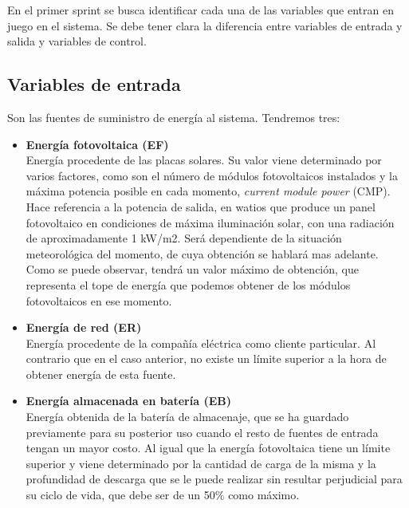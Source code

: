 En el primer sprint se busca identificar cada una de las variables que entran en juego en el sistema. Se debe tener clara la diferencia entre variables de entrada y salida y variables de control. 
\subsection{Variables de entrada} 
Son las fuentes de suministro de energía al sistema. Tendremos tres:
\begin{itemize}
	\item \textbf{Energía fotovoltaica (EF)}\\ Energía procedente de las placas solares. Su valor viene determinado por varios factores, como son el número de módulos fotovoltaicos instalados y la máxima potencia posible en cada momento, \textit{current module power} (CMP). Hace referencia a la potencia de salida, en watios que produce un panel fotovoltaico en condiciones de máxima iluminación solar, con una radiación de aproximadamente 1 kW/m2. Será dependiente de la situación meteorológica del momento, de cuya obtención se hablará mas adelante. Como se puede observar, tendrá un valor máximo de obtención, que representa el tope de energía que podemos obtener de los módulos fotovoltaicos en ese momento.
	\item \textbf{Energía de red (ER)}\\ Energía procedente de la compañía eléctrica como cliente particular. Al contrario que en el caso anterior, no existe un límite superior a la hora de obtener energía de esta fuente.
	\item \textbf{Energía almacenada en batería (EB)}\\ Energía obtenida de la batería de almacenaje, que se ha guardado previamente para su posterior uso cuando el resto de fuentes de entrada tengan un mayor costo. Al igual que la energía fotovoltaica tiene un límite superior y viene determinado por la cantidad de carga de la misma y la profundidad de descarga que se le puede realizar sin resultar perjudicial para su ciclo de vida, que debe ser de un 50\% como máximo.
\end{itemize}

